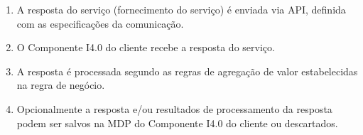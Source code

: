 \begin{enumerate}
		\item A resposta do serviço (fornecimento do serviço) é enviada via API, definida com as especificações da comunicação.
		\item O Componente I4.0 do cliente recebe a resposta do serviço.
		\item A resposta é processada segundo as regras de agregação de valor estabelecidas na regra de negócio.
		\item Opcionalmente a resposta e/ou resultados de processamento da resposta podem ser salvos na MDP do Componente I4.0 do cliente ou descartados.
	\end{enumerate}
